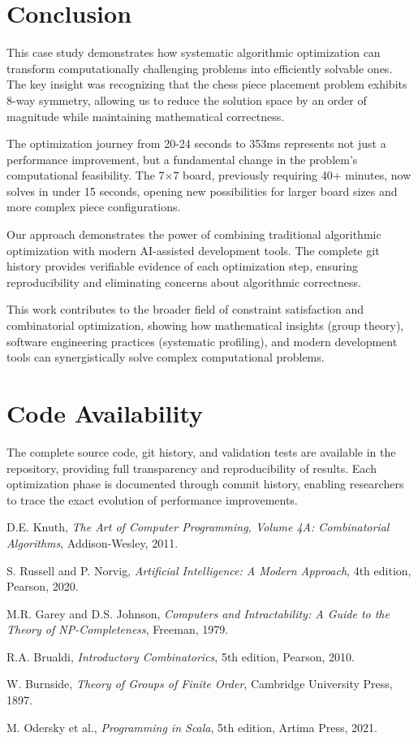 \documentclass[12pt,a4paper]{article}
\theoremstyle{definition}
\begin{document}
\section{Conclusion}

This case study demonstrates how systematic algorithmic optimization can transform computationally challenging problems into efficiently solvable ones. The key insight was recognizing that the chess piece placement problem exhibits 8-way symmetry, allowing us to reduce the solution space by an order of magnitude while maintaining mathematical correctness.

The optimization journey from 20-24 seconds to 353ms represents not just a performance improvement, but a fundamental change in the problem's computational feasibility. The 7$\times$7 board, previously requiring 40+ minutes, now solves in under 15 seconds, opening new possibilities for larger board sizes and more complex piece configurations.

Our approach demonstrates the power of combining traditional algorithmic optimization with modern AI-assisted development tools. The complete git history provides verifiable evidence of each optimization step, ensuring reproducibility and eliminating concerns about algorithmic correctness.

This work contributes to the broader field of constraint satisfaction and combinatorial optimization, showing how mathematical insights (group theory), software engineering practices (systematic profiling), and modern development tools can synergistically solve complex computational problems.

\section{Code Availability}

The complete source code, git history, and validation tests are available in the repository, providing full transparency and reproducibility of results. Each optimization phase is documented through commit history, enabling researchers to trace the exact evolution of performance improvements.


\begin{thebibliography}{99}

D.E. Knuth, \emph{The Art of Computer Programming, Volume 4A: Combinatorial Algorithms}, Addison-Wesley, 2011.

S. Russell and P. Norvig, \emph{Artificial Intelligence: A Modern Approach}, 4th edition, Pearson, 2020.

M.R. Garey and D.S. Johnson, \emph{Computers and Intractability: A Guide to the Theory of NP-Completeness}, Freeman, 1979.

R.A. Brualdi, \emph{Introductory Combinatorics}, 5th edition, Pearson, 2010.

W. Burnside, \emph{Theory of Groups of Finite Order}, Cambridge University Press, 1897.

M. Odersky et al., \emph{Programming in Scala}, 5th edition, Artima Press, 2021.

\end{thebibliography}
\end{document}
